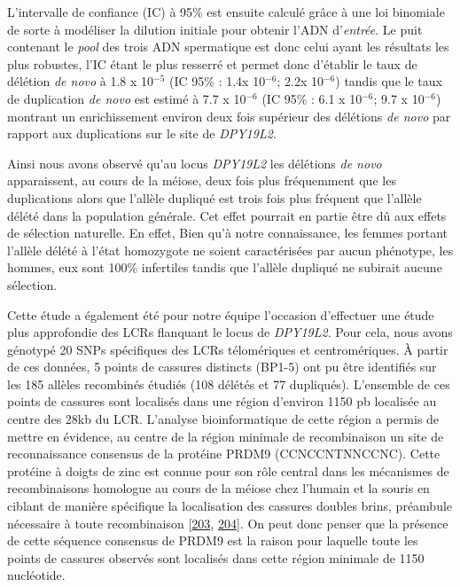 \documentclass[12pt,a4paper,twoside]{ugathesis}
\theoremstyle{definition}
\theoremstyle{definition}
\theoremstyle{definition}
\theoremstyle{remark}
\begin{document}
L'intervalle de confiance (IC) à 95\% est ensuite calculé grâce à une
loi binomiale de sorte à modéliser la dilution initiale pour obtenir
l'ADN d'\emph{entrée}. Le puit contenant le \emph{pool} des trois ADN
spermatique est donc celui ayant les résultats les plus robustes, l'IC
étant le plus resserré et permet donc d'établir le taux de délétion
\emph{de novo} à 1.8 x 10\(^{-5}\) (IC 95\% : 1.4x 10\(^{-6}\); 2.2x
10\(^{-6}\)) tandis que le taux de duplication \emph{de novo} est estimé
à 7.7 x 10\(^{-6}\) (IC 95\% : 6.1 x 10\(^{-6}\); 9.7 x 10\(^{-6}\))
montrant un enrichissement environ deux fois supérieur des délétions
\emph{de novo} par rapport aux duplications sur le site de
\emph{DPY19L2}.

Ainsi nous avons observé qu'au locus \emph{DPY19L2} les délétions
\emph{de novo} apparaissent, au cours de la méiose, deux fois plus
fréquemment que les duplications alors que l'allèle dupliqué est trois
fois plus fréquent que l'allèle délété dans la population générale. Cet
effet pourrait en partie être dû aux effets de sélection naturelle. En
effet, Bien qu'à notre connaissance, les femmes portant l'allèle délété
à l'état homozygote ne soient caractérisées par aucun phénotype, les
hommes, eux sont 100\% infertiles tandis que l'allèle dupliqué ne
subirait aucune sélection.

Cette étude a également été pour notre équipe l'occasion d'effectuer une
étude plus approfondie des LCRs flanquant le locus de \emph{DPY19L2}.
Pour cela, nous avons génotypé 20 SNPs spécifiques des LCRs télomériques
et centromériques. À partir de ces données, 5 points de cassures
distincts (BP1-5) ont pu être identifiés sur les 185 allèles recombinés
étudiés (108 délétés et 77 dupliqués). L'ensemble de ces points de
cassures sont localisés dans une région d'environ 1150 pb localisée au
centre des 28kb du LCR. L'analyse bioinformatique de cette région a
permis de mettre en évidence, au centre de la région minimale de
recombinaison un site de reconnaissance consensus de la protéine PRDM9
(CCNCCNTNNCCNC). Cette protéine à doigts de zinc est connue pour son
rôle central dans les mécanismes de recombinaisons homologue au cours de
la méiose chez l'humain et la souris en ciblant de manière spécifique la
localisation des cassures doubles brins, préambule nécessaire à toute
recombinaison {[}\protect\hyperlink{ref-Parvanov2010}{203},
\protect\hyperlink{ref-Baudat2010}{204}{]}. On peut donc penser que la
présence de cette séquence consensus de PRDM9 est la raison pour
laquelle toute les points de cassures observés sont localisés dans cette
région minimale de 1150 nucléotide.
\end{document}
